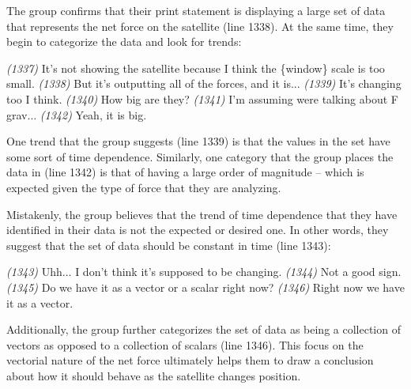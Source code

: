 \documentclass{msuphddissertation}
\begin{document}
\begin{doublespace}
The group confirms that their print statement is displaying a large set of data that represents the net force on the satellite (line 1338).  At the same time, they begin to categorize the data and look for trends:  \begin{description}
\SD \textit{(1337)} It's not showing {the satellite} because I think the \{window\} scale is too small.
\SD \textit{(1338)} But it's outputting all of {the forces}, and it is...
\SD \textit{(1339)} It's changing too I think.
\SB \textit{(1340)} How big are they?		
\SB \textit{(1341)} I'm assuming were talking about F grav...
\SC \textit{(1342)} Yeah, it is big.
\end{description}  One trend that the group suggests (line 1339) is that the values in the set have some sort of time dependence.  Similarly, one category that the group places the data in (line 1342) is that of having a large order of magnitude -- which is expected given the type of force that they are analyzing.

Mistakenly, the group believes that the trend of time dependence that they have identified in their data is not the expected or desired one.  In other words, they suggest that the set of data should be constant in time (line 1343):  \begin{description}
\SB \textit{(1343)} Uhh... I don't think it's supposed to be changing.
\SB \textit{(1344)} Not a good sign.
\SB \textit{(1345)} Do we have it as a vector or a scalar right now?
\SD \textit{(1346)} Right now we have it as a vector.
\end{description}  Additionally, the group further categorizes the set of data as being a collection of vectors as opposed to a collection of scalars (line 1346).  This focus on the vectorial nature of the net force ultimately helps them to draw a conclusion about how it should behave as the satellite changes position.


\end{doublespace}
\end{document}
